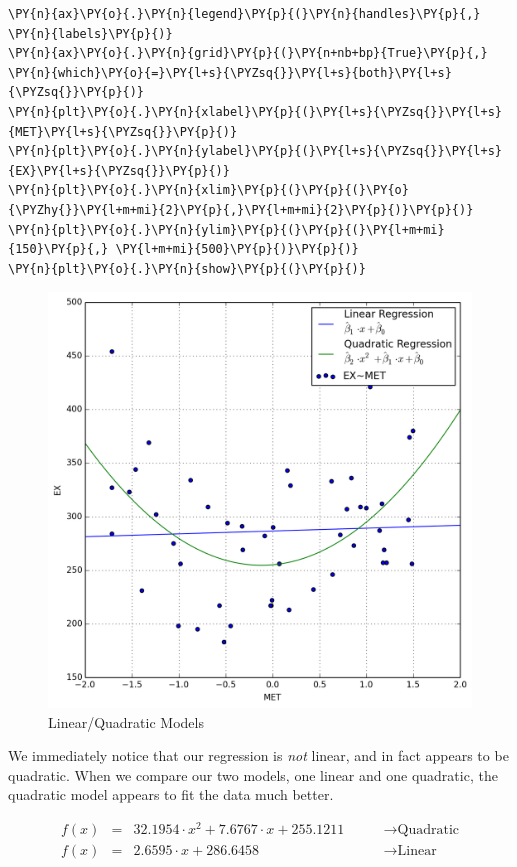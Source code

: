 \documentclass[10pt]{article}\usepackage[]{graphicx}\usepackage[]{xcolor}
\begin{document}
\begin{Verbatim}[commandchars=\\\{\}]
\PY{n}{ax}\PY{o}{.}\PY{n}{legend}\PY{p}{(}\PY{n}{handles}\PY{p}{,} \PY{n}{labels}\PY{p}{)}
\PY{n}{ax}\PY{o}{.}\PY{n}{grid}\PY{p}{(}\PY{n+nb+bp}{True}\PY{p}{,} \PY{n}{which}\PY{o}{=}\PY{l+s}{\PYZsq{}}\PY{l+s}{both}\PY{l+s}{\PYZsq{}}\PY{p}{)}
\PY{n}{plt}\PY{o}{.}\PY{n}{xlabel}\PY{p}{(}\PY{l+s}{\PYZsq{}}\PY{l+s}{MET}\PY{l+s}{\PYZsq{}}\PY{p}{)}
\PY{n}{plt}\PY{o}{.}\PY{n}{ylabel}\PY{p}{(}\PY{l+s}{\PYZsq{}}\PY{l+s}{EX}\PY{l+s}{\PYZsq{}}\PY{p}{)}
\PY{n}{plt}\PY{o}{.}\PY{n}{xlim}\PY{p}{(}\PY{p}{(}\PY{o}{\PYZhy{}}\PY{l+m+mi}{2}\PY{p}{,}\PY{l+m+mi}{2}\PY{p}{)}\PY{p}{)}
\PY{n}{plt}\PY{o}{.}\PY{n}{ylim}\PY{p}{(}\PY{p}{(}\PY{l+m+mi}{150}\PY{p}{,} \PY{l+m+mi}{500}\PY{p}{)}\PY{p}{)}
\PY{n}{plt}\PY{o}{.}\PY{n}{show}\PY{p}{(}\PY{p}{)}
\end{Verbatim}

    \begin{figure}[H]
        \centering
        \includegraphics[scale=0.6]{./img/lin_quad.png}
        \caption{Linear/Quadratic Models}
        \label{fig:linquad}
    \end{figure}
    
    We immediately notice that our regression is \emph{not} linear, and in fact appears to be quadratic. When we compare
    our two models, one linear and one quadratic, the quadratic model appears to fit the data much better.

    \begin{equation}
        \begin{aligned}
            f(x) &=& 32.1954 \cdot x^2 + 7.6767 \cdot x + 255.1211& \qquad \to \text{Quadratic}\\
            f(x) &=& 2.6595 \cdot x + 286.6458& \qquad \to \text{Linear}
        \end{aligned}
    \end{equation}
\end{document}
